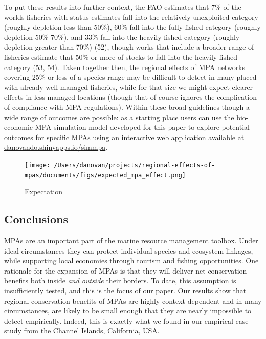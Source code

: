 \documentclass[9pt,twocolumn,twoside,lineno]{pnas-new}
\begin{document}
To put these results into further context, the FAO estimates that 7\% of
the worlds fisheries with status estimates fall into the relatively
unexploited category (roughly depletion less than 50\%), 60\% fall into
the fully fished category (roughly depletion 50\%-70\%), and 33\% fall
into the heavily fished category (roughly depletion greater than 70\%)
(52), though works that include a broader range of fisheries estimate
that 50\% or more of stocks to fall into the heavily fished category
(53, 54). Taken together then, the regional effects of MPA networks
covering 25\% or less of a species range may be difficult to detect in
many placed with already well-managed fisheries, while for that size we
might expect clearer effects in less-managed locations (though that of
course ignores the complication of compliance with MPA regulations).
Within these broad guidelines though a wide range of outcomes are
possible: as a starting place users can use the bio-economic MPA
simulation model developed for this paper to explore potential outcomes
for specific MPAs using an interactive web application available at
\href{https://danovando.shinyapps.io/simmpa/}{danovando.shinyapps.io/simmpa}.

\begin{figure}%
  \centering
  \texttt{[image: /Users/danovan/projects/regional-effects-of-mpas/documents/figs/expected\_mpa\_effect.png]}
  \caption{Expectation}
  \label{expect-plot}
\end{figure}

\hypertarget{conclusion}{%
\subsection*{Conclusions}\label{conclusion}}

MPAs are an important part of the marine resource management toolbox.
Under ideal circumstances they can protect individual species and
ecosystem linkages, while supporting local economies through tourism and
fishing opportunities. One rationale for the expansion of MPAs is that
they will deliver net conservation benefits both inside \emph{and
outside} their borders. To date, this assumption is insufficiently
tested, and this is the focus of our paper. Our results show that
regional conservation benefits of MPAs are highly context dependent and
in many circumstances, are likely to be small enough that they are
nearly impossible to detect empirically. Indeed, this is exactly what we
found in our empirical case study from the Channel Islands, California,
USA.
\end{document}
